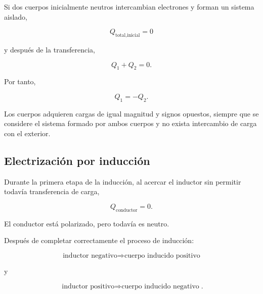 Si dos cuerpos inicialmente neutros intercambian electrones y forman un
sistema aislado,

\begin{equation}
    Q_{\text{total,inicial}}=0
\end{equation}

y después de la transferencia,

\begin{equation}
    Q_1+Q_2=0.
\end{equation}

Por tanto,

\begin{equation}
    \boxed{
    Q_1=-Q_2
    }.
\end{equation}

Los cuerpos adquieren cargas de igual magnitud y signos opuestos, siempre que
se considere el sistema formado por ambos cuerpos y no exista intercambio de
carga con el exterior.



\subsection{Electrización por inducción}

Durante la primera etapa de la inducción, al acercar el inductor sin permitir
todavía transferencia de carga,

\begin{equation}
    \boxed{
    Q_{\text{conductor}}=0
    }.
\end{equation}

El conductor está polarizado, pero todavía es neutro.

Después de completar correctamente el proceso de inducción:

\[
\boxed{
\text{inductor negativo}
\Longrightarrow
\text{cuerpo inducido positivo}
}
\]

y

\[
\boxed{
\text{inductor positivo}
\Longrightarrow
\text{cuerpo inducido negativo}
}.
\]

